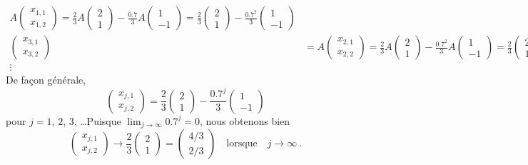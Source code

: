 {\begin{rmk}[\theory]
\begin{align*}
A \begin{pmatrix} x_{1,1} \\ x_{1,2} \end{pmatrix}
= \frac{2}{3} A\begin{pmatrix} 2 \\ 1 \end{pmatrix}
- \frac{0.7}{3} A\begin{pmatrix} 1 \\ -1 \end{pmatrix}
= \frac{2}{3} \begin{pmatrix} 2 \\ 1 \end{pmatrix}
- \frac{0.7^2}{3} \begin{pmatrix} 1 \\ -1 \end{pmatrix} \\
\begin{pmatrix} x_{3,1} \\ x_{3,2} \end{pmatrix} &=
A \begin{pmatrix} x_{2,1} \\ x_{2,2} \end{pmatrix}
= \frac{2}{3} A\begin{pmatrix} 2 \\ 1 \end{pmatrix}
- \frac{0.7^2}{3} A\begin{pmatrix} 1 \\ -1 \end{pmatrix}
= \frac{2}{3} \begin{pmatrix} 2 \\ 1 \end{pmatrix}
- \frac{0.7^3}{3} \begin{pmatrix} 1 \\ -1 \end{pmatrix} \\
\vdots &
\end{align*}           
De façon générale,
\[
\begin{pmatrix} x_{j,1} \\ x_{j,2} \end{pmatrix} =
\frac{2}{3} \begin{pmatrix} 2 \\ 1 \end{pmatrix}
- \frac{0.7^j}{3} \begin{pmatrix} 1 \\ -1 \end{pmatrix}
\]
pour $j=1$, $2$, $3$, \ldots\quad Puisque
$\displaystyle \lim_{j\to \infty} 0.7^j = 0$, nous obtenons bien
\[
\begin{pmatrix} x_{j,1} \\ x_{j,2} \end{pmatrix} \to
\frac{2}{3} \begin{pmatrix} 2 \\ 1 \end{pmatrix}
= \begin{pmatrix} 4/3 \\ 2/3 \end{pmatrix}
\quad \text{lorsque} \quad j \to \infty \ .
\]
\end{rmk}

}

